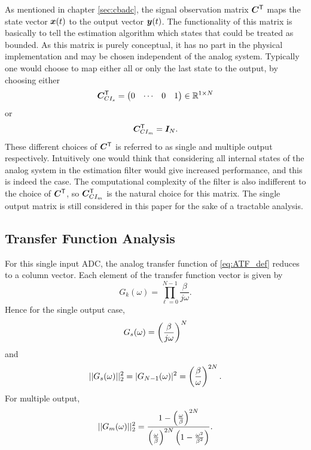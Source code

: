 As mentioned in chapter \ref{sec:cbadc}, the signal observation matrix $\bm{C}^\mathsf{T}$ maps the state vector $\bm{x}(t)$ to the output vector $\bm{y}(t)$. The functionality of this matrix is basically to tell the estimation algorithm which states that could be treated as bounded. As this matrix is purely conceptual, it has no part in the physical implementation and may be chosen independent of the analog system. Typically one would choose to map either all or only the last state to the output, by choosing either
\begin{equation}
    \label{eq:ci_cmats}
    \bm{C}^\mathsf{T}_{CI_s} =
        \begin{pmatrix}
            0 & \cdots & 0 & 1
        \end{pmatrix}
        \in \mathbb{R}^{1 \times N}
\end{equation}
or
\begin{equation}
    \label{eq:ci_cmatm}
    \bm{C}^\mathsf{T}_{CI_m} = \bm{I}_{N}.
\end{equation}
These different choices of $\bm{C}^\mathsf{T}$ is referred to as single and multiple output respectively. Intuitively one would think that considering all internal states of the analog system in the estimation filter would give increased performance, and this is indeed the case. The computational complexity of the filter is also indifferent to the choice of $\bm{C}^\mathsf{T}$, so $\bm{C}^\mathsf{T}_{CI_m}$ is the natural choice for this matrix. The single output matrix is still considered in this paper for the sake of a tractable analysis.


\subsection{Transfer Function Analysis}
For this single input ADC, the analog transfer function of \ref{eq:ATF_def} reduces to a column vector. Each element of the transfer function vector is given by
\begin{equation}
    G_k(\omega) = \prod_{\ell = 0}^{N-1} \frac{\beta}{j \omega}.
\end{equation}
Hence for the single output case,
\begin{equation}
    G_s(\omega) = \left( \frac{\beta}{j\omega} \right)^N
\end{equation}
and
\begin{equation}
    \label{eq:atf_ci_single}
    ||G_s(\omega)||_{2}^2 = |G_{N-1}(\omega)|^2 = \left(\frac{\beta}{\omega}\right)^{2N}.
\end{equation}
For multiple output,
\begin{equation}
    ||G_m(\omega)||_{2}^2 = \frac{1- \left( \frac{\omega}{\beta} \right)^{2N}}{ \left( \frac{\omega}{\beta} \right)^{2N} \left( 1 - \frac{\omega^2}{\beta^2} \right) }.
\end{equation}

